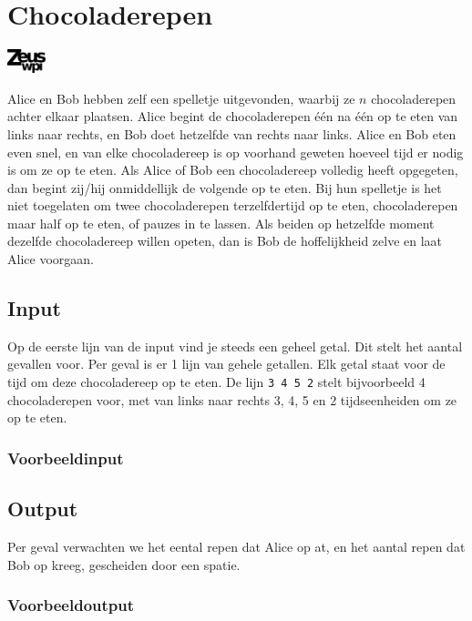 \documentclass[a4paper]{article}
\begin{document}
\section*{Chocoladerepen}
\flushright
\includegraphics[width=3em]{../logo-new.png}
\flushleft

Alice en Bob hebben zelf een spelletje uitgevonden, waarbij ze $n$
chocoladerepen achter elkaar plaatsen. Alice begint de chocoladerepen \'e\'en
na \'e\'en op te eten van links naar rechts, en Bob doet hetzelfde van rechts
naar links. Alice en Bob eten even snel, en van elke chocoladereep is op
voorhand geweten hoeveel tijd er nodig is om ze op te eten. Als Alice of Bob
een chocoladereep volledig heeft opgegeten, dan begint zij/hij onmiddellijk de
volgende op te eten. Bij hun spelletje is het niet toegelaten om twee
chocoladerepen terzelfdertijd op te eten, chocoladerepen maar half op te eten,
of pauzes in te lassen. Als beiden op hetzelfde moment dezelfde chocoladereep
willen opeten, dan is Bob de hoffelijkheid zelve en laat Alice voorgaan.

\subsection*{Input}

Op de eerste lijn van de input vind je steeds een geheel getal. Dit stelt het
aantal gevallen voor. Per geval is er 1 lijn van gehele getallen. Elk getal
staat voor de tijd om deze chocoladereep op te eten. De lijn \texttt{3 4 5 2}
stelt bijvoorbeeld 4 chocoladerepen voor, met van links naar rechts 3, 4, 5 en 2
tijdseenheiden om ze op te eten.

\subsubsection*{Voorbeeldinput}



\subsection*{Output}

Per geval verwachten we het eental repen dat Alice op at, en het aantal repen
dat Bob op kreeg, gescheiden door een spatie.

\subsubsection*{Voorbeeldoutput}


\end{document}
